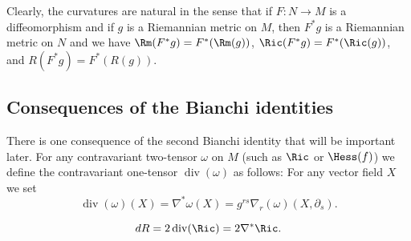 Clearly, the curvatures are natural in the sense that if $F\colon N
\rightarrow M$ is a diffeomorphism and if $g$ is a Riemannian metric
on $M$, then $F^*g$ is a Riemannian metric on $N$ and we have $\Rm(F^*g)=F^*(\Rm(g))$, $\Ric(F^{*}g) = F^{*}(\Ric(g))$, and $R(F^*g)=F^*(R(g))$.

\subsection{Consequences of the Bianchi identities}

There is one consequence of the second Bianchi identity that will be
important later. For any contravariant two-tensor $\omega$ on $M$
(such as $\Ric$ or $\Hess(f)$) we define the contravariant
one-tensor $\operatorname{div}(\omega)$ as follows: For any vector field $X$
we set
$$\operatorname{div}(\omega)(X)=\nabla^*\omega(X)=g^{rs}\nabla_r(\omega)(X,\partial_s).$$

\begin{lemma}
\label{lem:div-ricci-scalar-curvature}
\label{divRic}
\leanok
$$dR=2\operatorname{div}(\Ric)=2\nabla^*\Ric.$$
\end{lemma}

